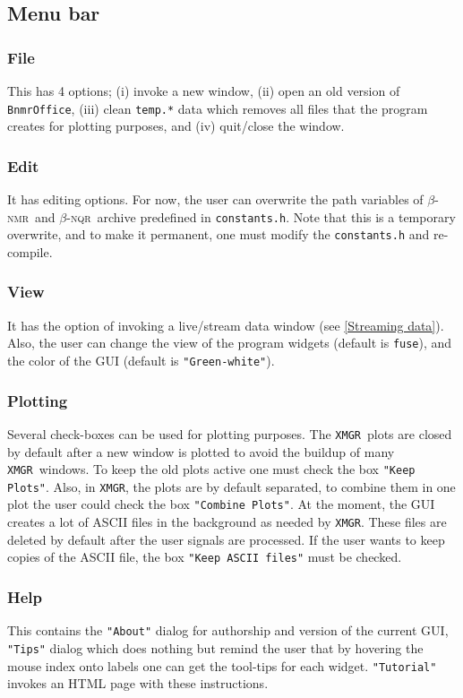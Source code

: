 \documentclass[10pt,letterpaper,oneside]{article}
\newcommand{\bnmr}{$\beta$-\textsc{nmr}}
\newcommand{\bnqr}{$\beta$-\textsc{nqr}}
\newcommand{\xmgr}{\texttt{XMGR}}
\newcommand{\bof}{\texttt{BnmrOffice}}
\begin{document}
\subsection{Menu bar}
\subsubsection{File}
This has 4 options; (i) invoke a new window, (ii) open an old version of \bof, (iii) clean \verb+temp.*+ data which removes all files that the program creates for plotting purposes, and (iv) quit/close the window.
\subsubsection{Edit}
It has editing options. For now, the user can overwrite the path variables of \bnmr\ and \bnqr\ archive predefined in \verb+constants.h+. Note that this is a temporary overwrite, and to make it permanent, one must modify the \verb+constants.h+ and re-compile.
\subsubsection{View}
It has the option of invoking a live/stream data window (see \ref{Streaming data}). Also, the user can change the view of the program widgets (default is \verb"fuse"), and the color of the GUI (default is \verb+"Green-white"+).
\subsubsection{Plotting}
Several check-boxes can be used for plotting purposes.
The \xmgr\ plots are closed by default after a new window is plotted to avoid the buildup of many \xmgr\ windows. To keep the old plots active one must check the box \verb+"Keep Plots"+. Also, in \xmgr, the plots are by default separated, to combine them in one plot the user could check the box \verb+"Combine Plots"+. At the moment, the GUI creates a lot of ASCII files in the background as needed by \xmgr. These files are deleted by default after the user signals are processed. If the user wants to keep copies of the ASCII file, the box \verb+"Keep ASCII files"+ must be checked.
\subsubsection{Help}
This contains the \verb+"About"+ dialog for authorship and version of the current GUI,  \verb+"Tips"+ dialog which does nothing but remind the user that by hovering the mouse index onto labels one can get the tool-tips for each widget. \verb+"Tutorial"+ invokes an HTML page with these instructions. 
\end{document}
